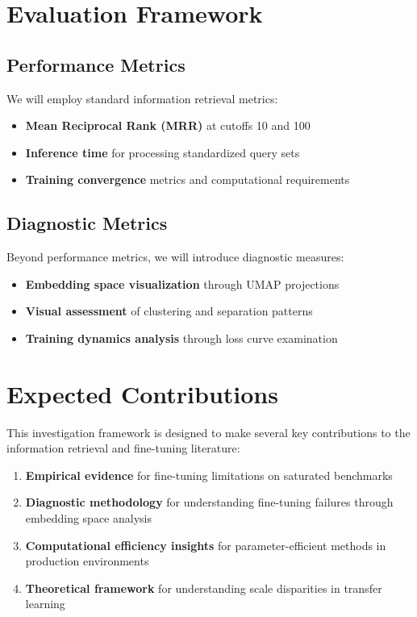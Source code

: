 \section{Evaluation Framework}

\subsection{Performance Metrics}

We will employ standard information retrieval metrics:

\begin{itemize}
\item \textbf{Mean Reciprocal Rank (MRR)} at cutoffs 10 and 100
\item \textbf{Inference time} for processing standardized query sets
\item \textbf{Training convergence} metrics and computational requirements
\end{itemize}

\subsection{Diagnostic Metrics}

Beyond performance metrics, we will introduce diagnostic measures:

\begin{itemize}
\item \textbf{Embedding space visualization} through UMAP projections
\item \textbf{Visual assessment} of clustering and separation patterns
\item \textbf{Training dynamics analysis} through loss curve examination
\end{itemize}

\section{Expected Contributions}

This investigation framework is designed to make several key contributions to the information retrieval and fine-tuning literature:

\begin{enumerate}
\item \textbf{Empirical evidence} for fine-tuning limitations on saturated benchmarks
\item \textbf{Diagnostic methodology} for understanding fine-tuning failures through embedding space analysis
\item \textbf{Computational efficiency insights} for parameter-efficient methods in production environments
\item \textbf{Theoretical framework} for understanding scale disparities in transfer learning
\end{enumerate}

